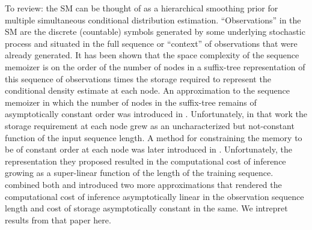 To review: the SM can be thought of as a hierarchical smoothing prior for multiple simultaneous conditional distribution estimation. 
 ``Observations'' in the SM are the discrete (countable) symbols generated by some underlying stochastic process and situated in the full sequence or ``context'' of observations that were already generated.  It has been shown that the space complexity of the sequence memoizer is on the order of the number of nodes in a suffix-tree representation of this sequence of observations times the storage required to represent the conditional density estimate at each node. An approximation to the sequence memoizer in which the number of nodes in the suffix-tree remains of asymptotically constant order was introduced in \citep{Bartlett2010}.  Unfortunately, in that work the storage requirement at each node grew as an uncharacterized but not-constant function of the input sequence length.  A method for constraining the memory to be of constant order at each node was later introduced in \citep{Gasthaus2011}.  Unfortunately, the representation they proposed resulted in the computational cost of inference growing as a super-linear function of the length of the training sequence.  \cite{Bartlett-2011-DCC} combined both and introduced two more approximations that rendered the computational cost of inference asymptotically linear in the observation sequence length and cost of storage asymptotically constant in the same.  We intrepret results from that paper here.  


